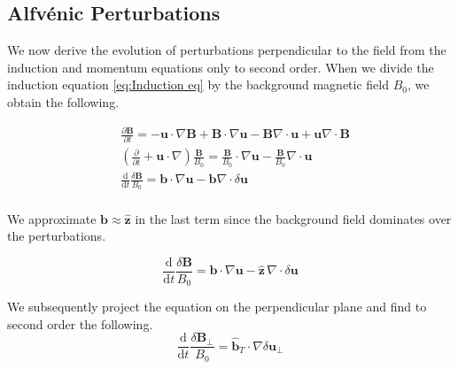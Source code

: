 \subsection{Alfv\'enic Perturbations}
We now derive the evolution of perturbations perpendicular to the field from the induction and momentum equations only to second order.
When we divide the induction equation \eqref{eq:Induction eq} by the background magnetic field \(B_{0}\), we obtain the following.

\begin{equation*}
 \begin{split}
     &\frac{\partial \boldsymbol{B}}{\partial t}= -\boldsymbol{u} \cdot \nabla\boldsymbol{B} + \boldsymbol{B} \cdot \nabla\boldsymbol{u}- \boldsymbol{B}\nabla \cdot \boldsymbol{u} + \boldsymbol{u} \nabla \cdot \boldsymbol{B}\\
     &\left(\frac{\partial}{\partial t} + \boldsymbol{u} \cdot \nabla\right)\frac{\boldsymbol{B}}{B_0} = \frac{\boldsymbol{B}}{B_0} \cdot \nabla\boldsymbol{u}- \frac{\boldsymbol{B}}{B_0}\nabla \cdot \boldsymbol{u} \\
     &\frac{\mathrm{d}}{\mathrm{d}t}\frac{\delta \boldsymbol{B}}{B_0} = \boldsymbol{b} \cdot \nabla \boldsymbol{u}- \boldsymbol{b}\nabla \cdot \delta \boldsymbol{u} \\
 \end{split}
\end{equation*}


We approximate \(\boldsymbol{b} \approx \hat{\boldsymbol{z}}\) in the last term since the background field dominates over the perturbations. 

\begin{equation}
     \frac{\mathrm{d}}{\mathrm{d}t}\frac{\delta \boldsymbol{B}}{B_0}= \boldsymbol{b} \cdot \nabla \boldsymbol{u} - \boldsymbol{\hat{\boldsymbol{z}}}\,\nabla \cdot \delta\boldsymbol{u}
     \label{eq:Induction sim}
\end{equation}

We subsequently project the equation on the perpendicular plane and find to second order the following.
\begin{equation}
     \frac{\mathrm{d}}{\mathrm{d}t}\frac{\delta \boldsymbol{B}_{\perp}}{B_0}=  \hat{\boldsymbol{b}}_{T}  \cdot \nabla \delta\boldsymbol{u}_{\perp} 
     \label{eq:Induction eqn perp}
\end{equation}

